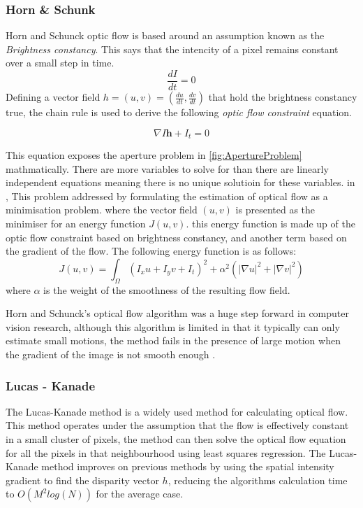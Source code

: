 \documentclass{UoNMCHA}
\numberwithin{equation}{section}
\begin{document}
\subsubsection{Horn \& Schunk}
Horn and Schunck optic flow is based around an assumption known as the \textit{Brightness constancy}. This says that the intencity of a pixel remains constant over a small step in time.
\begin{equation}
	\frac{dI}{dt} = 0
\end{equation}
Defining a vector field $h = (u, v) = \left(\frac{du}{dt}, \frac{dv}{dt}\right)$ that hold the brightness constancy true, the chain rule is used to derive the following \textit{optic flow constraint} equation.

\begin{equation}
	\nabla I \mathbf{h} + I_{t} = 0
\end{equation}

This equation exposes the aperture problem in \ref{fig:ApertureProblem} mathmatically. There are more variables to solve for than there are linearly independent equations meaning there is no unique solutioin for these variables. in \cite{horn1981determining}, This problem addressed by formulating the estimation of optical flow as a minimisation problem. where the vector field $(u, v)$ is presented as the minimiser for an energy function $J(u, v)$. this energy function is made up of the optic flow constraint based on brightness constancy, and another term based on the gradient of the flow. The following energy function is as follows:
\begin{equation}
	J(u, v) = \int_{\Omega}(I_{x}u + I_{y}v + I_{t})^{2} + \alpha^2(|\nabla u|^{2} + |\nabla v|^{2})
\end{equation}
where $\alpha$ is the weight of the smoothness of the resulting flow field.

Horn and Schunck's optical flow algorithm was a huge step forward in computer vision research, although this algorithm is limited in that it typically can only estimate small motions, the method fails in the presence of large motion when the gradient of the image is not smooth enough \citep{meinhardt2013horn}.

\subsubsection{Lucas - Kanade}
The Lucas-Kanade method is a widely used method for calculating optical flow. This method operates under the assumption that the flow is effectively constant in a small cluster of pixels, the method can then solve the optical flow equation for all the pixels in that neighbourhood using least squares regression. The Lucas-Kanade method improves on previous methods by using the spatial intensity gradient to find the disparity vector $h$, reducing the algorithms calculation time to $O(M^2log(N))$ for the average case.
\end{document}
